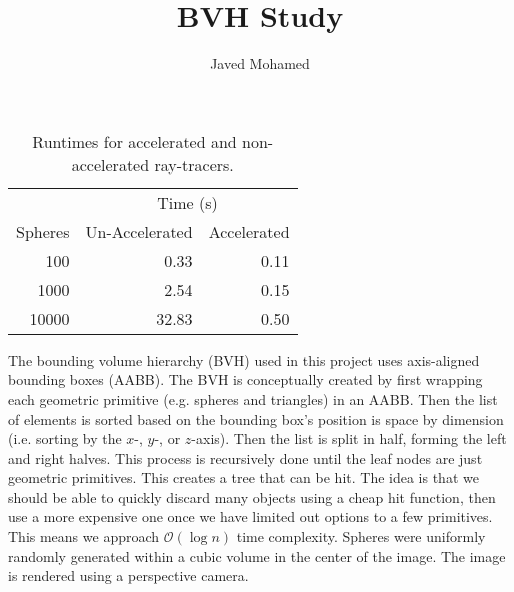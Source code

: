 \documentclass[a4]{article}
\author{Javed Mohamed}
\title{BVH Study}
\begin{document}
\maketitle

\begin{table*}[h]
  \centering
  \begin{tabular}[h]{rrr}
    \toprule
    & \multicolumn{2}{c}{Time (\si{\second})}\\
    \cmidrule(l){2-3}
    Spheres & Un-Accelerated & Accelerated \\
    \midrule
    100 & 0.33 & 0.11 \\
    1000 & 2.54 & 0.15 \\
    10000 & 32.83 & 0.50 \\
    \bottomrule
  \end{tabular}
  \caption[Ray-tracer runtimes]{Runtimes for accelerated and non-accelerated
    ray-tracers.}
  \label{tab:runtimes}
\end{table*}

The bounding volume hierarchy (BVH) used in this project uses axis-aligned
bounding boxes (AABB). The BVH is conceptually created by first wrapping each
geometric primitive (e.g. spheres and triangles) in an AABB. Then the list of
elements is sorted based on the bounding box's position is space by dimension
(i.e. sorting by the $x$-, $y$-, or $z$-axis). Then the list is split in half,
forming the left and right halves. This process is recursively done until the
leaf nodes are just geometric primitives. This creates a tree that can be hit.
The idea is that we should be able to quickly discard many objects using a cheap
hit function, then use a more expensive one once we have limited out options to
a few primitives. This means we approach $\mathcal{O}(\log n)$ time complexity.
Spheres were uniformly randomly generated within a cubic volume in the center of
the image. The image is rendered using a perspective camera.
\end{document}
